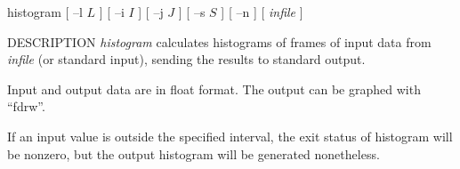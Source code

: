 % 
% 
% 
% 
%                                                                        
%
\hypertarget{histogram}{}

\begin{synopsis}
\item [histogram] [ --l $L$ ] [ --i $I$ ] [ --j $J$ ] [ --s $S$ ] [ --n ] 
                  [ {\em infile} ] 
\end{synopsis}

\begin{qsection}{DESCRIPTION}
{\em histogram} calculates histograms of frames of input data 
from {\em infile} (or standard input), 
sending the results to standard output.

Input and output data are in float format.
The output can be graphed with ``fdrw''.

If an input value is outside the specified interval, 
the exit status of histogram will be nonzero, 
but the output histogram will be generated nonetheless.
\end{qsection}


